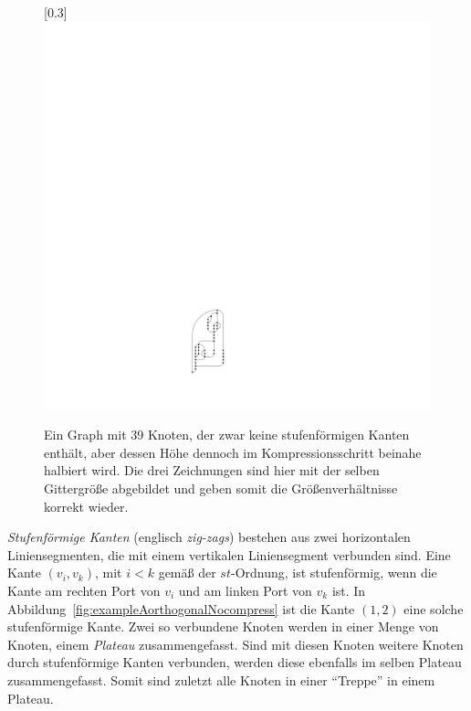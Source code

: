 \documentclass[a4paper]{scrreprt}
\theoremstyle{definition}
\begin{document}
\begin{figure}[h]
        \quad
       [0.3\textwidth]
            {\includegraphics[scale=.7]{compressableGraph/isSmooth}}
 
 
        \caption{Ein Graph mit 39 Knoten, der zwar keine stufenförmigen Kanten enthält, aber dessen Höhe dennoch im Kompressionsschritt beinahe halbiert wird. Die drei Zeichnungen sind hier mit der selben Gittergröße abgebildet und geben somit die Größenverhältnisse korrekt wieder.}
        \label{fig:orthognalCompress}
\end{figure}

\emph{Stufenförmige Kanten} (englisch \emph{zig-zags}) bestehen aus zwei horizontalen Liniensegmenten, die mit einem vertikalen Liniensegment verbunden sind. Eine Kante $(v_i, v_k)$, mit $i < k$ gemäß der $st$-Ordnung, ist stufenförmig, wenn die Kante am rechten Port von $v_i$ und am linken Port von $v_k$ ist. In Abbildung~\ref{fig:exampleAorthogonalNocompress} ist die Kante $(1,2)$ eine solche stufenförmige Kante. Zwei so verbundene Knoten werden in einer Menge von Knoten, einem \emph{Plateau} zusammengefasst. Sind mit diesen Knoten weitere Knoten durch stufenförmige Kanten verbunden, werden diese ebenfalls im selben Plateau zusammengefasst. Somit sind zuletzt alle Knoten in einer "`Treppe"' in einem Plateau.
\end{document}
